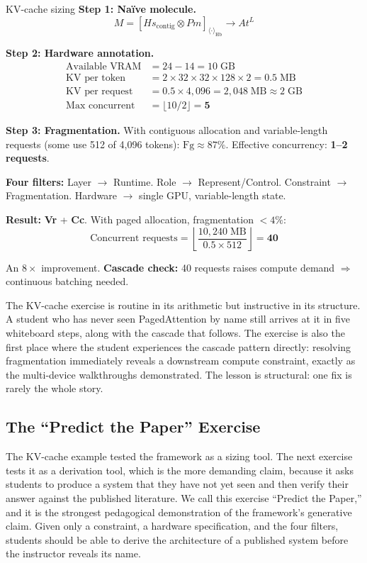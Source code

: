 \documentclass[10pt,twocolumn]{article}
\begin{document}
\begin{napkinmath}{KV-cache sizing}
\textbf{Step 1: Na\"ive molecule.}
\[
M = [Hs_{\text{contig}} \otimes Pm]_{\langle \cdot \rangle_{\text{Hb}}} \rightarrow At^L
\]

\textbf{Step 2: Hardware annotation.}
\begin{align*}
\text{Available VRAM} &= 24 - 14 = 10\;\text{GB} \\
\text{KV per token} &= 2 \times 32 \times 32 \times 128 \times 2 = 0.5\;\text{MB} \\
\text{KV per request} &= 0.5 \times 4{,}096 = 2{,}048\;\text{MB} \approx 2\;\text{GB} \\
\text{Max concurrent} &= \lfloor 10 / 2 \rfloor = \mathbf{5}
\end{align*}

\textbf{Step 3: Fragmentation.} With contiguous allocation and variable-length requests (some use 512 of 4,096 tokens): $\text{Fg} \approx 87\%$. Effective concurrency: \textbf{1--2 requests}.

\textbf{Four filters:} Layer $\to$ Runtime. Role $\to$ Represent/Control. Constraint $\to$ Fragmentation. Hardware $\to$ single GPU, variable-length state.

\textbf{Result:} \textbf{Vr} + \textbf{Cc}. With paged allocation, fragmentation $<4\%$:
\[
\text{Concurrent requests} = \left\lfloor \frac{10{,}240\;\text{MB}}{0.5 \times 512} \right\rfloor = \mathbf{40}
\]

An $8\times$ improvement. \textbf{Cascade check:} 40 requests raises compute demand $\Rightarrow$ continuous batching needed.
\end{napkinmath}

The KV-cache exercise is routine in its arithmetic but instructive in its structure. A student who has never seen PagedAttention by name still arrives at it in five whiteboard steps, along with the cascade that follows. The exercise is also the first place where the student experiences the cascade pattern directly: resolving fragmentation immediately reveals a downstream compute constraint, exactly as the multi-device walkthroughs demonstrated. The lesson is structural: one fix is rarely the whole story.

\subsection{The ``Predict the Paper'' Exercise}
\label{sec:predict-paper}

The KV-cache example tested the framework as a sizing tool. The next exercise tests it as a derivation tool, which is the more demanding claim, because it asks students to produce a system that they have not yet seen and then verify their answer against the published literature. We call this exercise ``Predict the Paper,'' and it is the strongest pedagogical demonstration of the framework's generative claim. Given only a constraint, a hardware specification, and the four filters, students should be able to derive the architecture of a published system before the instructor reveals its name.
\end{document}
